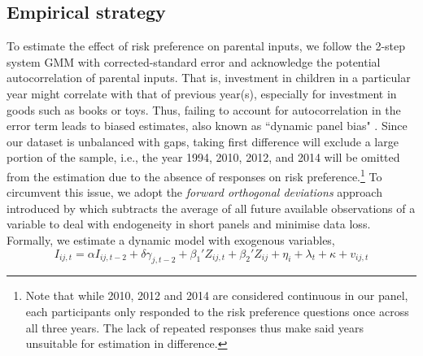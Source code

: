 \documentclass[]{article}
\begin{document}
\subsection{Empirical strategy}
To estimate the effect of risk preference on parental inputs, we follow the 2-step system GMM \citep{arellano1991some,blundell1998initial} with corrected-standard error \citep{windmeijer2005finite} and acknowledge the potential autocorrelation of parental inputs. That is, investment in children in a particular year might correlate with that of previous year(s), especially for investment in goods such as books or toys. Thus, failing to account for autocorrelation in the error term leads to biased estimates, also known as ``dynamic panel bias" \citep{nickell1981biases}. Since our dataset is unbalanced with gaps, taking first difference will exclude a large portion of the sample, i.e., the year 1994, 2010, 2012, and 2014 will be omitted from the estimation due to the absence of responses on risk preference.\footnote{Note that while 2010, 2012 and 2014 are considered continuous in our panel, each participants only responded to the risk preference questions once across all three years. The lack of repeated responses thus make said years unsuitable for estimation in difference.} To circumvent this issue, we adopt the \textit{forward orthogonal deviations} approach introduced by \citet{arellano1995another} which subtracts the average of all future available observations of a variable to deal with endogeneity in short panels and minimise data loss. Formally, we estimate a dynamic model with exogenous variables,
\begin{equation}
	I_{ij,t}=\alpha I_{ij,t-2} + \delta\gamma_{j,t-2}+ \beta_1' Z_{ij,t} + \beta_2' Z_{ij} + \eta_i + \lambda_t + \kappa + v_{ij,t}
	\label{eq:empirical-specification}
\end{equation}
\end{document}
